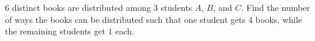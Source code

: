 $6$ distinct books are distributed among $3$ students $A$, $B$, and $C$. Find the number of ways the books can be distributed such that one student gets $4$ books, while the remaining students get $1$ each.
